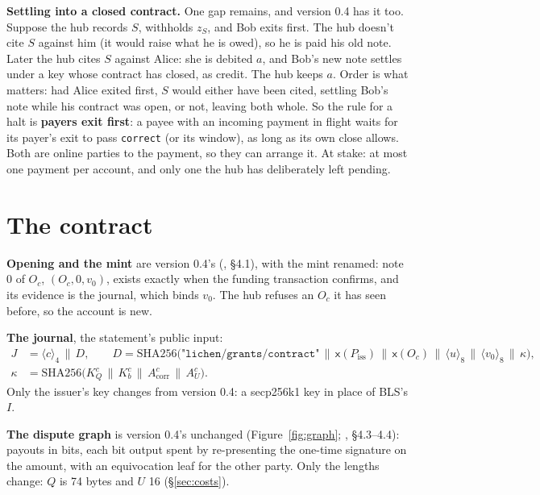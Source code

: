 \documentclass[11pt]{article}
\theoremstyle{plain}
\theoremstyle{definition}
\newcommand{\tx}[1]{\texttt{#1}}
\newcommand{\be}[2]{\langle #1\rangle_{#2}}
\newcommand{\xo}[1]{\mathsf{x}(#1)}
\newcommand{\Piss}{P_{\mathrm{iss}}}
\newcommand{\Oc}{O_c}
\newcommand{\KQ}{K_{Q}^{c}}
\newcommand{\Kb}{K_{b}^{c}}
\newcommand{\Acorr}{A_{\mathrm{corr}}^{c}}
\newcommand{\AU}{A_{U}^{c}}
\begin{document}
\textbf{Settling into a closed contract.} One gap remains, and version
0.4 has it too. Suppose the hub records $S$, withholds $z_S$, and Bob
exits first. The hub doesn't cite $S$ against him (it would raise what
he is owed), so he is paid his old note. Later the hub cites $S$ against
Alice: she is debited $a$, and Bob's new note settles under a key whose
contract has closed, as credit. The hub keeps $a$. Order is what
matters: had Alice exited first, $S$ would either have been cited,
settling Bob's note while his contract was open, or not, leaving both
whole. So the rule for a halt is \textbf{payers exit first}: a payee
with an incoming payment in flight waits for its payer's exit to pass
\tx{correct} (or its window), as long as its own close allows. Both are
online parties to the payment, so they can arrange it. At stake: at
most one payment per account, and only one the hub has deliberately
left pending.

\section{The contract}\label{sec:contract}

\textbf{Opening and the mint} are version 0.4's (\cite{grants04},
\S4.1), with the mint renamed: note 0 of $\Oc$, $(\Oc, 0, v_0)$, exists
exactly when the funding transaction confirms, and its evidence is the
journal, which binds $v_0$. The hub refuses an $\Oc$ it has seen before,
so the account is new.

\textbf{The journal}, the statement's public input:
\begin{align*}
  J &= \be{c}{4} \,\|\, D,\qquad
  D = \mathrm{SHA256}\big(\texttt{"lichen/grants/contract"} \,\|\,
  \xo{\Piss} \,\|\, \xo{\Oc} \,\|\, \be{u}{8} \,\|\, \be{v_0}{8} \,\|\,
  \kappa\big),\\
  \kappa &= \mathrm{SHA256}\big(\KQ \,\|\, \Kb \,\|\, \Acorr \,\|\, \AU\big).
\end{align*}
Only the issuer's key changes from version 0.4: a secp256k1 key in
place of BLS's $I$.

\textbf{The dispute graph} is version 0.4's unchanged
(Figure~\ref{fig:graph}; \cite{grants04}, \S4.3--4.4): payouts in bits,
each bit output spent by re-presenting the one-time signature on the
amount, with an equivocation leaf for the other party. Only the lengths
change: $Q$ is 74 bytes and $U$ 16 (\S\ref{sec:costs}).
\end{document}
